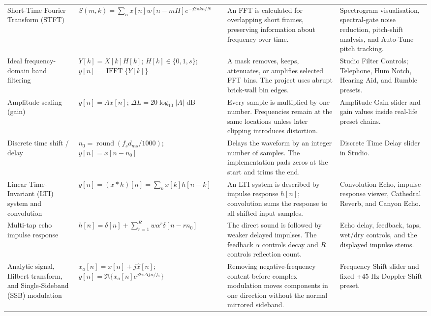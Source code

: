 \documentclass[11pt,a4paper]{article}
\begin{document}
{\begin{longtable}{@{}p{.19\linewidth}p{.26\linewidth}p{.25\linewidth}p{.22\linewidth}@{}}
Short-Time Fourier Transform (STFT) & \(S(m,k)=\sum_nx[n]w[n-mH]e^{-j2\pi kn/N}\) & An FFT is calculated for overlapping short frames, preserving information about frequency over time. & Spectrogram visualisation, spectral-gate noise reduction, pitch-shift analysis, and Auto-Tune pitch tracking.\\

Ideal frequency-domain band filtering & \(Y[k]=X[k]H[k]\); \(H[k]\in\{0,1,s\}\); \(y[n]=\operatorname{IFFT}\{Y[k]\}\) & A mask removes, keeps, attenuates, or amplifies selected FFT bins. The project uses abrupt brick-wall bin edges. & Studio Filter Controls; Telephone, Hum Notch, Hearing Aid, and Rumble presets.\\

Amplitude scaling (gain) & \(y[n]=Ax[n]\); \(\Delta L=20\log_{10}|A|\) dB & Every sample is multiplied by one number. Frequencies remain at the same locations unless later clipping introduces distortion. & Amplitude Gain slider and gain values inside real-life preset chains.\\

Discrete time shift / delay & \(n_0=\operatorname{round}(f_sd_{ms}/1000)\); \(y[n]=x[n-n_0]\) & Delays the waveform by an integer number of samples. The implementation pads zeros at the start and trims the end. & Discrete Time Delay slider in Studio.\\

Linear Time-Invariant (LTI) system and convolution & \(y[n]=(x*h)[n]=\sum_kx[k]h[n-k]\) & An LTI system is described by impulse response \(h[n]\); convolution sums the response to all shifted input samples. & Convolution Echo, impulse-response viewer, Cathedral Reverb, and Canyon Echo.\\

Multi-tap echo impulse response & \(h[n]=\delta[n]+\sum_{r=1}^{R}w\alpha^r\delta[n-rn_0]\) & The direct sound is followed by weaker delayed impulses. The feedback \(\alpha\) controls decay and \(R\) controls reflection count. & Echo delay, feedback, taps, wet/dry controls, and the displayed impulse stems.\\

Analytic signal, Hilbert transform, and Single-Sideband (SSB) modulation & \(x_a[n]=x[n]+j\hat{x}[n]\); \(y[n]=\Re\{x_a[n]e^{j2\pi\Delta fn/f_s}\}\) & Removing negative-frequency content before complex modulation moves components in one direction without the normal mirrored sideband. & Frequency Shift slider and fixed +45 Hz Doppler Shift preset.\\


\end{longtable}}
\end{document}
